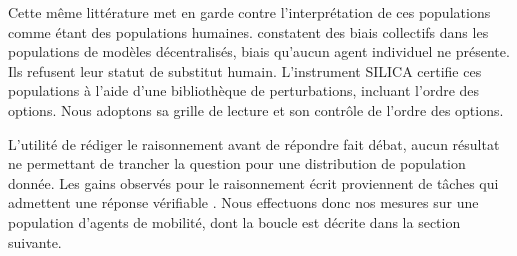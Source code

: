Cette même littérature met en garde contre l'interprétation de ces populations comme étant des populations humaines. \citet{baronchelli2025emergent} constatent des biais collectifs dans les populations de modèles décentralisés, biais qu'aucun agent individuel ne présente. Ils refusent leur statut de substitut humain. L'instrument SILICA \citep{bintareaf2026silica} certifie ces populations à l'aide d'une bibliothèque de perturbations, incluant l'ordre des options. Nous adoptons sa grille de lecture et son contrôle de l'ordre des options.

L'utilité de rédiger le raisonnement avant de répondre fait débat, aucun résultat ne permettant de trancher la question pour une distribution de population donnée. Les gains observés pour le raisonnement écrit proviennent de tâches qui admettent une réponse vérifiable \citep{wei2022chain,sprague2024cot}. Nous effectuons donc nos mesures sur une population d'agents de mobilité, dont la boucle est décrite dans la section suivante.
